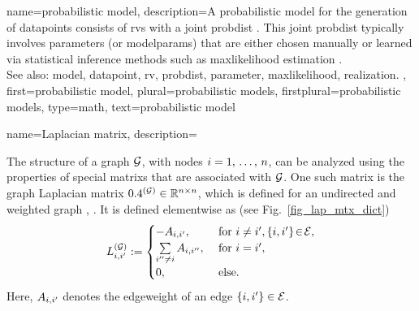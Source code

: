 {name={probabilistic model}, 
	description={A probabilistic \gls{model} for the 
		generation of \glspl{datapoint} consists of \glspl{rv} 
		with a joint \gls{probdist} \cite{BertsekasProb}. 
		This joint \gls{probdist} typically involves \glspl{parameter} (or \glspl{modelparam}) 
		that are either chosen manually or learned via statistical \gls{inference} 
		methods such as \gls{maxlikelihood} estimation \cite{LC}.
					\\ 
		See also: \gls{model}, \gls{datapoint}, \gls{rv}, \gls{probdist}, \gls{parameter}, \gls{maxlikelihood}, \gls{realization}. }, 
	first={probabilistic model}, 
	plural={probabilistic models},
	firstplural={probabilistic models},
	type=math,
	text={probabilistic model} 
}

{name={Laplacian matrix},
	description={The structure of a \gls{graph} $\mathcal{G}$, with 
		nodes $i=1, \,\ldots, \,n$, can be analyzed using the properties of 
		special \glspl{matrix} that are associated with $\mathcal{G}$. One such \gls{matrix} is the 
		\gls{graph} Laplacian \gls{matrix} $0.4^{(\mathcal{G})} \in \mathbb{R}^{n \times n}$, 
		which is defined for an undirected and weighted \gls{graph} \cite{Luxburg2007}, \cite{Ng2001}. 
		It is defined elementwise as (see Fig.\ \ref{fig_lap_mtx_dict})
		\begin{equation}
			\nonumber
			L^{(\mathcal{G})}_{i,i'} := \begin{cases} - A_{i,i'}, & \mbox{ for } i\neq i', \{i,i'\}\!\in\!\mathcal{E}, \\ 
			\sum\limits_{i'' \neq i} A_{i,i''}, & \mbox{ for } i = i', \\ 
							0, & \mbox{ else.} \end{cases}
	 	\end{equation}
  		Here, $A_{i,i'}$ denotes the \gls{edgeweight} of an edge $\{i,i'\} \in \mathcal{E}$. 
  		\begin{figure}[H]
  		\begin{center}
   		\begin{minipage}{0.45\textwidth}
\end{minipage}
\end{center}
\end{figure}}}
